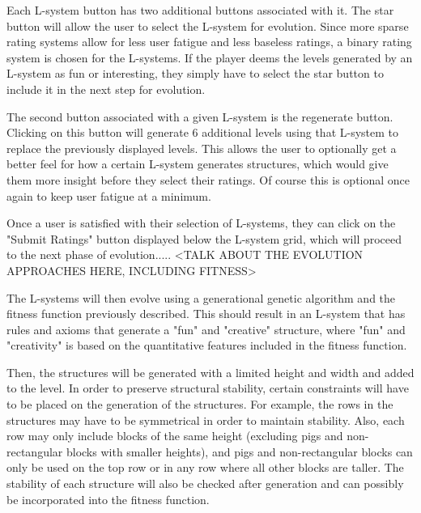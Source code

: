 \documentclass[letterpaper, 10 pt, conference]{ieeeconf}
\begin{document}
\par
Each L-system button has two additional buttons associated with it. The star button will allow the user to select the L-system for evolution. Since more sparse rating systems allow for less user fatigue and less baseless ratings, a binary rating system is chosen for the L-systems. If the player deems the levels generated by an L-system as fun or interesting, they simply have to select the star button to include it in the next step for evolution.
\par
The second button associated with a given L-system is the regenerate button. Clicking on this button will generate 6 additional levels using that L-system to replace the previously displayed levels. This allows the user to optionally get a better feel for how a certain L-system generates structures, which would give them more insight before they select their ratings. Of course this is optional once again to keep user fatigue at a minimum.
\par
Once a user is satisfied with their selection of L-systems, they can click on the "Submit Ratings" button displayed below the L-system grid, which will proceed to the next phase of evolution..... <TALK ABOUT THE EVOLUTION APPROACHES HERE, INCLUDING FITNESS>
\par
The L-systems will then evolve using a generational genetic algorithm and the fitness function previously described. This should result in an L-system that has rules and axioms that generate a "fun" and "creative" structure, where "fun" and "creativity" is based on the quantitative features included in the fitness function. 
\par
Then, the structures will be generated with a limited height and width and added to the level. In order to preserve structural stability, certain constraints will have to be placed on the generation of the structures. For example, the rows in the structures may have to be symmetrical in order to maintain stability. Also, each row may only include blocks of the same height (excluding pigs and non-rectangular blocks with smaller heights), and pigs and non-rectangular blocks can only be used on the top row or in any row where all other blocks are taller. The stability of each structure will also be checked after generation and can possibly be incorporated into the fitness function.
\end{document}
